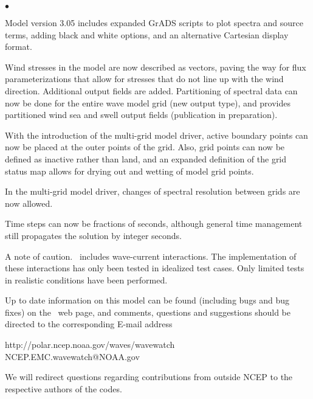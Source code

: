 \begin{list}{$\bullet$}{\rightmargin 5mm \parsep 0mm \itemsep 0mm}
\item
Model version 3.05 includes expanded GrADS scripts to plot spectra and source
terms, adding black and white options, and an alternative Cartesian display
format.

\item
Wind stresses in the model are now described as vectors, paving the way for
flux parameterizations that allow for stresses that do not line up with the
wind direction. Additional output fields are added. Partitioning of spectral
data can now be done for the entire wave model grid (new output type), and
provides partitioned wind sea and swell output fields (publication in
preparation).

\item
With the introduction of the multi-grid model driver, active boundary points
can now be placed at the outer points of the grid. Also, grid points can now
be defined as inactive rather than land, and an expanded definition of the
grid status map allows for drying out and wetting of model grid points.

\item
In the multi-grid model driver, changes of spectral resolution between grids
are now allowed.

\item
Time steps can now be fractions of seconds, although general time management
still propagates the solution by integer seconds.

\end{list}

\vspace{\baselineskip} \noindent 
A note of caution. \ww\ includes wave-current interactions. The implementation
of these interactions has only been tested in idealized test cases. Only
limited tests in realistic conditions have been performed.

\vspace{\baselineskip} \noindent 
Up to date information on this model can be found (including bugs and bug
fixes) on the \ww\ web page, and comments, questions and suggestions should be
directed to the corresponding E-mail address

\begin{center}
http://polar.ncep.noaa.gov/waves/wavewatch \\
NCEP.EMC.wavewatch@NOAA.gov
\end{center}

\noindent
We will redirect questions regarding contributions from outside NCEP to the
respective authors of the codes.


